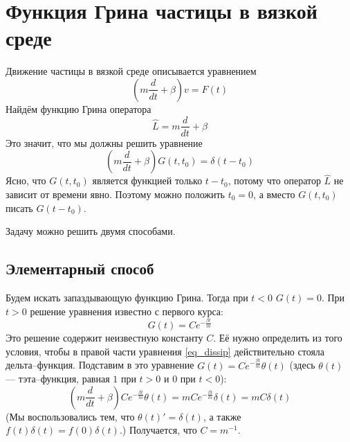 \documentclass{article}
\begin{document}
\section{Функция Грина частицы в вязкой среде}
Движение частицы в вязкой среде описывается уравнением 
\begin{equation}
    (m\frac{d}{dt} + \beta)v = F(t)
\end{equation}
Найдём функцию Грина оператора
\begin{equation}
    \hat{L} = m\frac{d}{dt} + \beta
\end{equation}
Это значит, что мы должны решить уравнение
\begin{equation}
    \label{eq_dissip}
    \left(m\frac{d}{dt} + \beta\right)G(t,t_0) = \delta(t - t_0)
\end{equation}
Ясно, что $G(t, t_0)$ является функцией только $t - t_0$, потому что 
оператор $\hat{L}$ не зависит от времени явно. Поэтому можно положить $t_0 = 0$, а вместо
$G(t,t_0)$ писать $G(t - t_0)$.

Задачу можно решить двумя способами. 
\subsection{Элементарный способ}
Будем искать запаздывающую функцию Грина. Тогда при $t < 0$ $G(t) = 0$. При $t > 0$ решение
уравнения известно с первого курса: 
\begin{equation}
    G(t) = C e^{-\frac{\beta t}{m}}
\end{equation}
Это решение содержит неизвестную константу $C$. Её нужно определить из того условия, 
чтобы в правой части уравнения \eqref{eq_dissip} действительно стояла дельта--функция.
Подставим в это уравнение $G(t) = Ce^{-\frac{\beta t}{m}} \theta(t)$ 
(здесь $\theta(t)$ --- тэта--функция, равная $1$ при $t > 0$ и $0$ при $t < 0$):
\begin{equation}
    \left(m\frac{d}{dt} + \beta\right)Ce^{-\frac{\beta t}{m}} \theta(t) = 
        m C e^{-\frac{\beta t}{m}} \delta(t) = mC\delta(t)
\end{equation}
(Мы воспользовались тем, что $\theta(t)' = \delta(t)$, а также 
$f(t)\delta(t) = f(0) \delta(t)$.) Получается, что $C = m^{-1}$.
\end{document}
